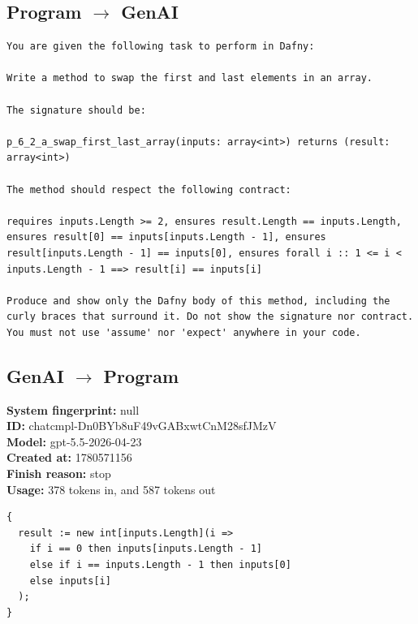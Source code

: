 \documentclass{article}
\begin{document}
\subsection*{Program $\rightarrow$ GenAI}
\begin{lstlisting}
You are given the following task to perform in Dafny:

Write a method to swap the first and last elements in an array.

The signature should be:

p_6_2_a_swap_first_last_array(inputs: array<int>) returns (result: array<int>)

The method should respect the following contract:

requires inputs.Length >= 2, ensures result.Length == inputs.Length, ensures result[0] == inputs[inputs.Length - 1], ensures result[inputs.Length - 1] == inputs[0], ensures forall i :: 1 <= i < inputs.Length - 1 ==> result[i] == inputs[i]

Produce and show only the Dafny body of this method, including the curly braces that surround it. Do not show the signature nor contract. You must not use 'assume' nor 'expect' anywhere in your code.
\end{lstlisting}
\subsection*{GenAI $\rightarrow$ Program}
\textbf{System fingerprint: }null
\\\textbf{ID: }chatcmpl-Dn0BYb8uF49vGABxwtCnM28sfJMzV
\\\textbf{Model: }gpt-5.5-2026-04-23
\\\textbf{Created at: }1780571156
\\\textbf{Finish reason: }stop
\\\textbf{Usage: }378 tokens in, and 587 tokens out
\begin{lstlisting}
{
  result := new int[inputs.Length](i =>
    if i == 0 then inputs[inputs.Length - 1]
    else if i == inputs.Length - 1 then inputs[0]
    else inputs[i]
  );
}
\end{lstlisting}
\end{document}

